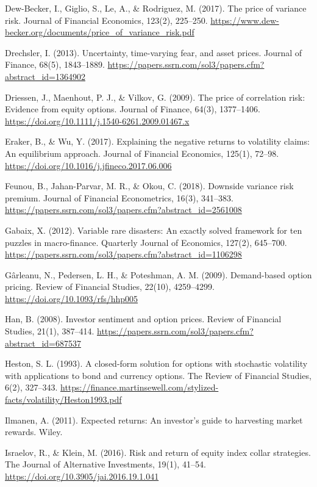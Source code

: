 \documentclass[11pt,a4paper]{article}
\begin{document}
\begin{fshfreferences}
\item Dew-Becker, I., Giglio, S., Le, A., \& Rodriguez, M. (2017). The price of variance risk. Journal of Financial Economics, 123(2), 225--250. \url{https://www.dew-becker.org/documents/price_of_variance_risk.pdf}
\item Drechsler, I. (2013). Uncertainty, time-varying fear, and asset prices. Journal of Finance, 68(5), 1843--1889. \url{https://papers.ssrn.com/sol3/papers.cfm?abstract_id=1364902}
\item Driessen, J., Maenhout, P. J., \& Vilkov, G. (2009). The price of correlation risk: Evidence from equity options. Journal of Finance, 64(3), 1377--1406. \url{https://doi.org/10.1111/j.1540-6261.2009.01467.x}
\item Eraker, B., \& Wu, Y. (2017). Explaining the negative returns to volatility claims: An equilibrium approach. Journal of Financial Economics, 125(1), 72--98. \url{https://doi.org/10.1016/j.jfineco.2017.06.006}
\item Feunou, B., Jahan-Parvar, M. R., \& Okou, C. (2018). Downside variance risk premium. Journal of Financial Econometrics, 16(3), 341--383. \url{https://papers.ssrn.com/sol3/papers.cfm?abstract_id=2561008}
\item Gabaix, X. (2012). Variable rare disasters: An exactly solved framework for ten puzzles in macro-finance. Quarterly Journal of Economics, 127(2), 645--700. \url{https://papers.ssrn.com/sol3/papers.cfm?abstract_id=1106298}
\item G\^arleanu, N., Pedersen, L. H., \& Poteshman, A. M. (2009). Demand-based option pricing. Review of Financial Studies, 22(10), 4259--4299. \url{https://doi.org/10.1093/rfs/hhp005}
\item Han, B. (2008). Investor sentiment and option prices. Review of Financial Studies, 21(1), 387--414. \url{https://papers.ssrn.com/sol3/papers.cfm?abstract_id=687537}
\item Heston, S. L. (1993). A closed-form solution for options with stochastic volatility with applications to bond and currency options. The Review of Financial Studies, 6(2), 327--343. \url{https://finance.martinsewell.com/stylized-facts/volatility/Heston1993.pdf}
\item Ilmanen, A. (2011). Expected returns: An investor's guide to harvesting market rewards. Wiley.
\item Israelov, R., \& Klein, M. (2016). Risk and return of equity index collar strategies. The Journal of Alternative Investments, 19(1), 41--54. \url{https://doi.org/10.3905/jai.2016.19.1.041}

\end{fshfreferences}
\end{document}
